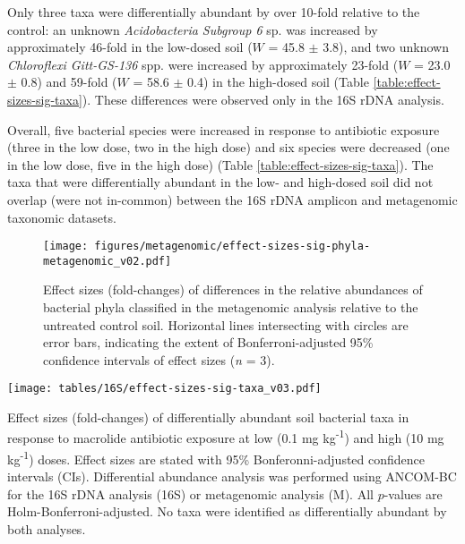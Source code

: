 Only three taxa were differentially abundant by over 10-fold relative to the control:
an unknown \textit{Acidobacteria Subgroup 6} sp. was increased by approximately 46-fold in the low-dosed soil ($W$ = 45.8 $\pm$ 3.8), and two unknown \textit{Chloroflexi Gitt-GS-136} spp. were increased by approximately 23-fold ($W$ = 23.0 $\pm$ 0.8) and 59-fold ($W$ = 58.6 $\pm$ 0.4) in the high-dosed soil (Table \ref{table:effect-sizes-sig-taxa}).
These differences were observed only in the 16S rDNA analysis.

Overall, five bacterial species were increased in response to antibiotic exposure (three in the low dose, two in the high dose) and six species were decreased (one in the low dose, five in the high dose) (Table \ref{table:effect-sizes-sig-taxa}).
The taxa that were differentially abundant in the low- and high-dosed soil did not overlap (were not in-common) between the 16S rDNA amplicon and metagenomic taxonomic datasets.

\begin{figure}[htpb]
	\centering
		\texttt{[image: figures/metagenomic/effect-sizes-sig-phyla-metagenomic\_v02.pdf]}
	\caption[Effect sizes (fold-changes) of differences in the relative abundances of bacterial phyla classified in the metagenomic analysis relative to the untreated control soil.]{
		Effect sizes (fold-changes) of differences in the relative abundances of bacterial phyla classified in the metagenomic analysis relative to the untreated control soil.
		Horizontal lines intersecting with circles are error bars, indicating the extent of Bonferroni-adjusted 95\% confidence intervals of effect sizes (\textit{n} = 3).
	}
	\label{fig:effect-sizes-sig-phyla-metagenomic}
\end{figure}

\begin{table}[htpb]
	\centering
		\texttt{[image: tables/16S/effect-sizes-sig-taxa\_v03.pdf]}
	\caption[Effect sizes (fold-changes) of differentially abundant soil bacterial taxa in response to macrolide antibiotic exposure at low (0.1 mg kg\textsuperscript{-1}) and high (10 mg kg\textsuperscript{-1}) doses.]{
		Effect sizes (fold-changes) of differentially abundant soil bacterial taxa in response to macrolide antibiotic exposure at low (0.1 mg kg\textsuperscript{-1}) and high (10 mg kg\textsuperscript{-1}) doses.
		Effect sizes are stated with 95\% Bonferonni-adjusted confidence intervals (CIs).
		Differential abundance analysis was performed using ANCOM-BC for the 16S rDNA analysis (16S) or metagenomic analysis (M).
		All $p$-values are Holm-Bonferroni-adjusted.
		No taxa were identified as differentially abundant by both analyses.
	}
	\label{table:effect-sizes-sig-taxa}
\end{table}

